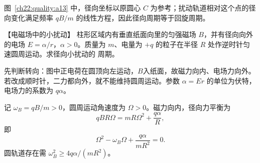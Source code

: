 {\begin{xesolution}
图~\ref{ch22:quality:a13} 中，径向坐标以原圆心 $C$ 为参考；扰动轨道相对这个点的径向变化满足频率 $qB/m$ 的线性方程，因此径向周期等于回旋周期。
\end{xesolution}



\begin{origexamplebox}{【电磁场中的小扰动】}\label{ch22:ex:s38-7-14}
柱形区域内有垂直纸面向里的匀强磁场 $B$，并有径向向外的电场
$E=\alpha/r$，$\alpha>0$。质量为 $m$、电量为 $+q$ 的粒子在半径 $R$ 处作逆时针匀速圆周运动。求径向小扰动的
周期。

\begin{center}
\end{center}
\end{origexamplebox}\par\nopagebreak[4]

\begin{xesolution}
先判断转向：图中正电荷在圆顶向左运动，$B$入纸面，故磁力向内、电场力向外。
若改成顺时针，二力都向外，就不能维持圆周运动。参数 $\alpha=Er$ 的单位为伏特，电场力的系数为 $q\alpha$。

记 $\omega_B=qB/m>0$，圆周运动角速度为 $\Omega>0$。磁力向内，径向力平衡为
\begin{equation}
  qBR\Omega=mR\Omega^2+\frac{q\alpha}R,
\end{equation}
即
\begin{equation}
  \Omega^2-\omega_B\Omega+\frac{q\alpha}{mR^2}=0.
\end{equation}
圆轨道存在需 $\omega_B^2\ge4q\alpha/(mR^2)$。


\end{xesolution}}
